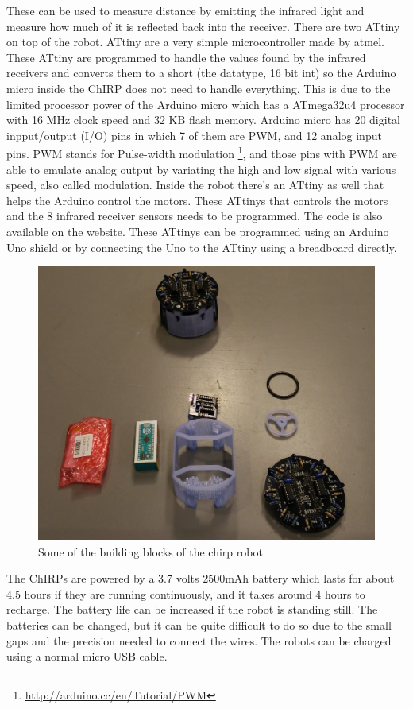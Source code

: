 These can be used to measure distance by emitting the infrared light and measure how much of it is reflected back into the receiver. There are two ATtiny on top of the robot. ATtiny are a very simple microcontroller made by atmel. These ATtiny are programmed to handle the values found by the infrared receivers and converts them to a short (the datatype, 16 bit int) so the Arduino micro inside the ChIRP does not need to handle everything. This is due to the limited processor power of the Arduino micro which has a ATmega32u4 processor with 16 MHz clock speed and 32 KB flash memory. Arduino micro has 20 digital inpput/output (I/O) pins in which 7 of them are PWM, and 12 analog input pins. PWM stands for Pulse-width modulation \footnote{\href{http://arduino.cc/en/Tutorial/PWM}{http://arduino.cc/en/Tutorial/PWM}}, and those pins with PWM are able to emulate analog output by variating the high and low signal with various speed, also called modulation.
Inside the robot there's an ATtiny as well that helps the Arduino control the motors. These ATtinys that controls the motors and the 8 infrared receiver sensors needs to be programmed. The code is also available on the website. These ATtinys can be programmed using an Arduino Uno shield or by connecting the Uno to the ATtiny using a breadboard directly.
\begin{figure}[H]
	\centering
	\includegraphics[width=0.8\linewidth]{images/chirpPieces}
	\caption[ChIRP pieces]{Some of the building blocks of the chirp robot}
\end{figure}


The ChIRPs are powered by a 3.7 volts 2500mAh battery which lasts for about 4.5 hours if they are running continuously, and it takes around 4 hours to recharge. The battery life can be increased if the robot is standing still. The batteries can be changed, but it can be quite difficult to do so due to the small gaps and the precision needed to connect the wires. The robots can be charged using a normal micro USB cable.



